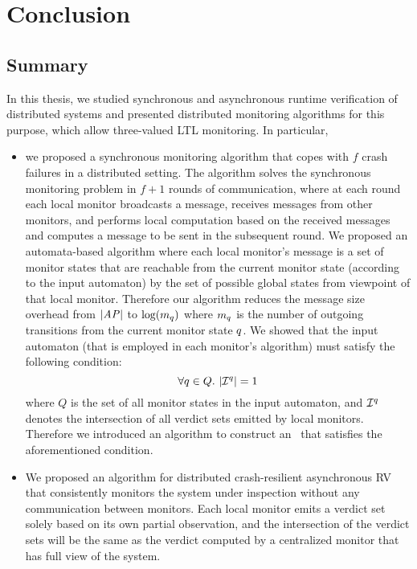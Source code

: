 \chapter{Conclusion}
\label{chap:Conclusion}

\section{Summary}


In this thesis, we studied synchronous and asynchronous runtime verification of 
distributed systems and presented distributed monitoring algorithms 
for this purpose, which allow three-valued LTL monitoring. In particular,

\begin{itemize}

\item we proposed a synchronous monitoring algorithm that copes with $f$ crash 
failures in a distributed setting. The algorithm solves the synchronous 
monitoring problem in $f+1$ rounds of communication, where at each round each 
local monitor broadcasts a message, receives messages from other monitors, and 
performs local computation based on the received messages and computes a message 
to be sent in the subsequent round. We proposed an automata-based algorithm 
where each local monitor's message is a set of monitor states that are reachable 
from the current monitor state (according to the input automaton) by the set of 
possible global states from viewpoint of that local monitor. Therefore our 
algorithm reduces the message size overhead from $|\mathit{AP}|$ to $\log(m_q)$ 
where $m_q$ is the number of outgoing transitions from the current 
monitor state $q$. We showed that the input automaton (that is employed 
in each monitor's algorithm) must satisfy the following condition:
$$\forall q \in Q.~ |\mathcal{I}^q| = 1$$ where $Q$ is the set of all 
monitor states in the input automaton, and $\mathcal{I}^q$ denotes the 
intersection of all verdict sets emitted by local monitors. Therefore we 
introduced an algorithm to construct an \Exltl~that satisfies the aforementioned 
condition.

\item We proposed an algorithm for distributed crash-resilient asynchronous RV that consistently monitors the system under inspection without any communication between monitors. Each local monitor emits a verdict set solely based on its own partial observation, and the intersection of the verdict sets will be the same as the verdict computed by a centralized monitor that has full view of the system. 

\end{itemize}


